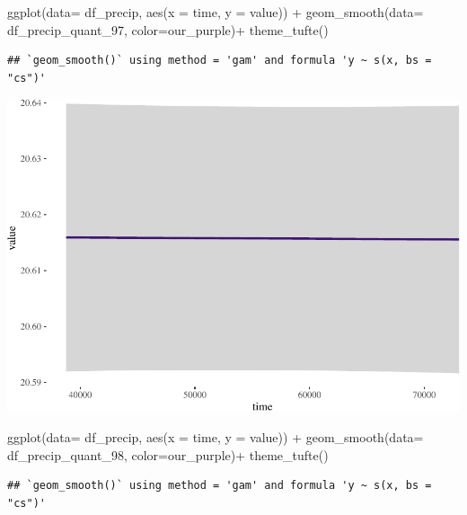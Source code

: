 \documentclass[
  paper=a4,
  ,captions=tableheading
]{scrartcl}
\newenvironment{Shaded}{\begin{snugshade}}{\end{snugshade}}
\newcommand{\AttributeTok}[1]{\textcolor[rgb]{0.77,0.63,0.00}{#1}}
\newcommand{\FunctionTok}[1]{\textcolor[rgb]{0.00,0.00,0.00}{#1}}
\newcommand{\NormalTok}[1]{#1}
\newcommand{\SpecialCharTok}[1]{\textcolor[rgb]{0.00,0.00,0.00}{#1}}
\begin{document}
\begin{Shaded}
\begin{Highlighting}[]
\FunctionTok{ggplot}\NormalTok{(}\AttributeTok{data=}\NormalTok{ df\_precip, }\FunctionTok{aes}\NormalTok{(}\AttributeTok{x =}\NormalTok{ time, }\AttributeTok{y =}\NormalTok{ value)) }\SpecialCharTok{+} 
     \FunctionTok{geom\_smooth}\NormalTok{(}\AttributeTok{data=}\NormalTok{ df\_precip\_quant\_97, }\AttributeTok{color=}\NormalTok{our\_purple)}\SpecialCharTok{+}
  \FunctionTok{theme\_tufte}\NormalTok{()}
\end{Highlighting}
\end{Shaded}

\begin{verbatim}
## `geom_smooth()` using method = 'gam' and formula 'y ~ s(x, bs = "cs")'
\end{verbatim}

\includegraphics{Haskell_files/figure-latex/unnamed-chunk-49-4.pdf}

\begin{Shaded}
\begin{Highlighting}[]
\FunctionTok{ggplot}\NormalTok{(}\AttributeTok{data=}\NormalTok{ df\_precip, }\FunctionTok{aes}\NormalTok{(}\AttributeTok{x =}\NormalTok{ time, }\AttributeTok{y =}\NormalTok{ value)) }\SpecialCharTok{+} 
     \FunctionTok{geom\_smooth}\NormalTok{(}\AttributeTok{data=}\NormalTok{ df\_precip\_quant\_98, }\AttributeTok{color=}\NormalTok{our\_purple)}\SpecialCharTok{+}
  \FunctionTok{theme\_tufte}\NormalTok{()}
\end{Highlighting}
\end{Shaded}

\begin{verbatim}
## `geom_smooth()` using method = 'gam' and formula 'y ~ s(x, bs = "cs")'
\end{verbatim}
\end{document}
